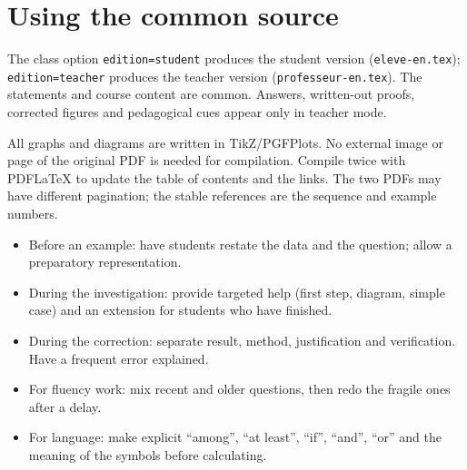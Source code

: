 \section*{Using the common source}
\begin{keypoint}
The class option \texttt{edition=student} produces the student version (\texttt{eleve-en.tex}); \texttt{edition=teacher} produces the teacher version (\texttt{professeur-en.tex}). The statements and course content are common. Answers, written-out proofs, corrected figures and pedagogical cues appear only in teacher mode.
\end{keypoint}
All graphs and diagrams are written in TikZ/PGFPlots. No external image or page of the original PDF is needed for compilation. Compile twice with PDFLaTeX to update the table of contents and the links. The two PDFs may have different pagination; the stable references are the sequence and example numbers.
\begin{method}
\begin{itemize}
\item Before an example: have students restate the data and the question; allow a preparatory representation.
\item During the investigation: provide targeted help (first step, diagram, simple case) and an extension for students who have finished.
\item During the correction: separate result, method, justification and verification. Have a frequent error explained.
\item For fluency work: mix recent and older questions, then redo the fragile ones after a delay.
\item For language: make explicit ``among'', ``at least'', ``if'', ``and'', ``or'' and the meaning of the symbols before calculating.
\end{itemize}
\end{method}
